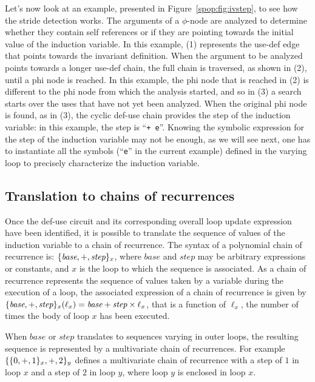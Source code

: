 {Let's now look at an example, presented in
Figure~\ref{spop:fig:ivstep}, to see how the stride detection works.
The arguments of a $\phi$-node are analyzed to determine whether they
contain self references or if they are pointing towards the initial
value of the induction variable.  In this example, (1) represents the
use-def edge that points towards the invariant definition.  When the
argument to be analyzed points towards a longer use-def chain, the
full chain is traversed, as shown in (2), until a phi node is reached.
In this example, the phi node that is reached in (2) is different to
the phi node from which the analysis started, and so in (3) a search
starts over the uses that have not yet been analyzed.  When the
original phi node is found, as in (3), the cyclic def-use chain
provides the step of the induction variable: in this example, the step
is ``\texttt{+ e}''.  Knowing the symbolic expression for the step of
the induction variable may not be enough, as we will see next, one has
to instantiate all the symbols (``\texttt{e}'' in the current example)
defined in the varying loop to precisely characterize the induction
variable.

\subsection{Translation to chains of recurrences}

Once the def-use circuit  and its corresponding overall loop
update expression have been identified, it is possible to translate the
sequence of values of the induction variable to a chain of recurrence.
The syntax of a polynomial chain of recurrence is: $\{\textit{base}, +,
  \textit{step}\}_x$, where $\textit{base}$ and $\textit{step}$ may be arbitrary expressions
or constants, and $x$ is the loop to which the sequence is
associated.  As a chain of recurrence represents the sequence of values
taken by a variable during the execution of a loop, the associated expression of a
chain of recurrence is given by $\{\textit{base}, +, \textit{step}\}_x (\ell_x) =
\textit{base} + \textit{step} \times \ell_x$, that is a function of $\ell_x$,
the number of times the body of loop $x$ has been executed.

When $base$ or $step$ translates to sequences varying in outer
loops, the resulting sequence is represented by a multivariate chain
of recurrences.  For example $\{\{0, +, 1\}_x, +, 2\}_y$
defines a multivariate chain of recurrence with a step of $1$ in loop
$x$ and a step of $2$ in loop $y$, where loop $y$ is enclosed in loop
$x$.

}
